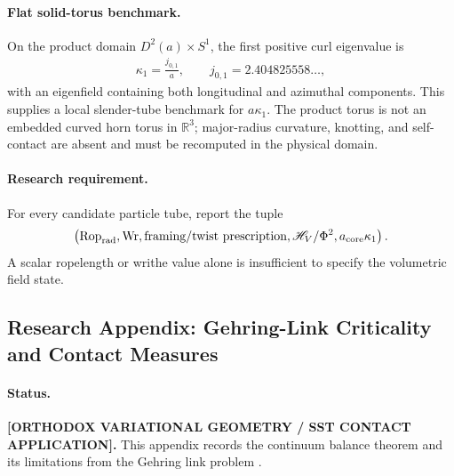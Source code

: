     \paragraph{Flat solid-torus benchmark.}
    On the product domain \(D^2(a)\times S^1\), the first positive curl eigenvalue is
    \begin{align}
        \kappa_1
        =
        \frac{j_{0,1}}{a},
        \qquad
        j_{0,1}=2.404825558\ldots,
        \label{eq:rt_flat_solid_torus_eigenvalue}
    \end{align}
    with an eigenfield containing both longitudinal and azimuthal components.  This
    supplies a local slender-tube benchmark for \(a\kappa_1\).  The product torus is
    not an embedded curved horn torus in \(\mathbb R^3\); major-radius curvature,
    knotting, and self-contact are absent and must be recomputed in the physical
    domain.

    \paragraph{Research requirement.}
    For every candidate particle tube, report the tuple
    \begin{align}
        \left(
        \operatorname{Rop}_{\rm rad},
        \operatorname{Wr},
        \text{framing/twist prescription},
        \mathscr H_V/\Phi^2,
        a_{\rm core}\kappa_1
        \right).
        \label{eq:rt_writhe_helicity_audit_tuple}
    \end{align}
    A scalar ropelength or writhe value alone is insufficient to specify the
    volumetric field state.

\subsection{Research Appendix: Gehring-Link Criticality and Contact Measures}
    \label{subsec:rt_gehring_contact_measure}

    \paragraph{Status.}
    \textbf{[ORTHODOX VARIATIONAL GEOMETRY / SST CONTACT APPLICATION].}
    This appendix records the continuum balance theorem and its limitations from
    the Gehring link problem
    \cite{CantarellaFuKusnerSullivanWrinkle2006Gehring}.

